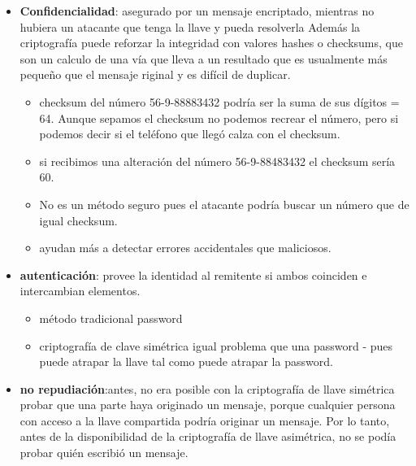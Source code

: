 \begin{itemize}
    \item \textbf{Confidencialidad}: asegurado por un mensaje encriptado, mientras no hubiera un atacante que tenga la llave y pueda resolverla
     Además la criptografía puede reforzar la integridad con valores hashes o checksums, que son un calculo de una vía que lleva a un resultado que es usualmente más pequeño que el mensaje riginal y es difícil de duplicar. 
    \begin{itemize}
    \item checksum del número 56-9-88883432 podría ser la suma de sus dígitos = 64. Aunque sepamos el checksum no podemos recrear el número, pero si podemos decir si el teléfono que llegó calza con el checksum. 
    \item si recibimos una alteración del número 56-9-88483432 el checksum sería 60.
    \item No es un método seguro pues el atacante podría buscar un número que de igual checksum. 
    \item ayudan más a detectar errores accidentales que maliciosos. 
    \end{itemize}
    \item \textbf{autenticación}: provee la identidad al remitente si ambos coinciden e intercambian elementos. 
    \begin{itemize}
        \item método tradicional password
        \item criptografía de clave simétrica igual problema que una password - pues puede atrapar la llave tal como puede atrapar la password. 
    \end{itemize}
    \item \textbf{no repudiación}:antes,  no era posible con la criptografía de llave simétrica  probar que una parte haya originado un mensaje, porque cualquier persona con acceso a la llave compartida podría originar un mensaje. Por lo tanto, antes de la disponibilidad de la criptografía de llave asimétrica, no se podía probar quién escribió un mensaje.
    
\end{itemize}






